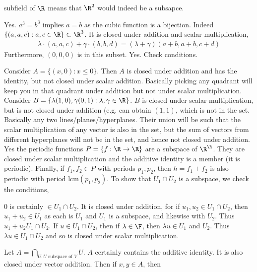 \documentclass{book}
\begin{document}
\begin{enumerate}[label=\arabic*)]
    subfield of $\R$ means that $\R^2$ would indeed be a subsapce.
    \ii 
      \begin{enumerate}[label=\alph*)]
        \ii Yes. $a^3 = b^3$ implies $a = b$ as the cubic function is a bijection. Indeed $\{(a, a, c): a, c \in \R\} \subset \R^3$. It is closed under addition and scalar
        multiplication,
        \begin{align*}
          \lambda\cdot(a, a, c) + \gamma\cdot(b, b, d) = (\lambda + \gamma)(a + b, a + b, c + d)
        \end{align*}
        Furthermore, $(0, 0, 0)$ is in this subset.
        \ii Yes. Check conditions.
      \end{enumerate}
    \ii
      Consider $A = \{(x, 0): x \leq 0\}$. Then $A$ is closed under addition and has the identity, but not closed under scalar addition. Basically picking any quadrant will
      keep you in that quadrant under addition but not under scalar multiplication.
    \ii
      Consider $B = \{\lambda(1, 0), \gamma(0, 1): \lambda, \gamma \in \R\}$. $B$ is closed under scalar multiplication, but is not closed under addition (e.g. can obtain $(1,
      1)$, which is not in the set. Basically any two lines/planes/hyperplanes. Their union will be such that the scalar multiplication of any vector is also in the set, but
      the sum of vectors from different hyperplanes will not be in the set, and hence not closed under addition. 
    \ii 
      Yes the periodic functions $P = \{f: \R \to \R\}$ are a subspace of $\R^\R$. They are closed under scalar multiplication and the additive identity is a member (it is
      periodic). Finally, if $f_1, f_2 \in P$ with periods $p_1, p_2$, then $h = f_1 + f_2$ is also periodic with period lcm$(p_1, p_2)$.
    \ii 
      To show that $U_1 \cap U_2$ is a subspace, we check the conditions,
    \begin{enumerate}[label=\arabic*)]
      \ii $0$ is certainly $\in U_1 \cap U_2$.
      \ii It is closed under addition, for if $u_1, u_2 \in U_1 \cap U_2$, then $u_1 + u_2 \in U_1$ as each is $U_1$ and $U_1$ is a subspace, and likewise with $U_2$. Thus
      $u_1 + u_2 U_1 \cap U_2$.
      \ii If $u \in U_1 \cap U_2$, then if $\lambda \in \F$, then $\lambda u \in U_1$ and $U_2$. Thus $\lambda u \in U_1 \cap U_2$ and so is closed under scalar
      multiplication.
    \end{enumerate}
    \ii 
      Let $A = \bigcap_{U: U \text{ subspace of } V}U$. $A$ certainly contains the additive identity. It is also closed under vector addition. Then if $x, y \in A$, then

\end{enumerate}
\end{document}
